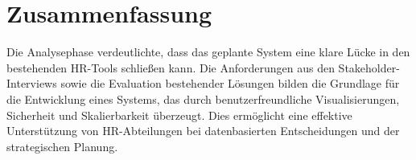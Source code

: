 \section{Zusammenfassung}
Die Analysephase verdeutlichte, dass das geplante System eine klare Lücke in den bestehenden HR-Tools schließen kann. Die Anforderungen aus den Stakeholder-Interviews sowie die Evaluation bestehender Lösungen bilden die Grundlage für die Entwicklung eines Systems, das durch benutzerfreundliche Visualisierungen, Sicherheit und Skalierbarkeit überzeugt. Dies ermöglicht eine effektive Unterstützung von HR-Abteilungen bei datenbasierten Entscheidungen und der strategischen Planung.

